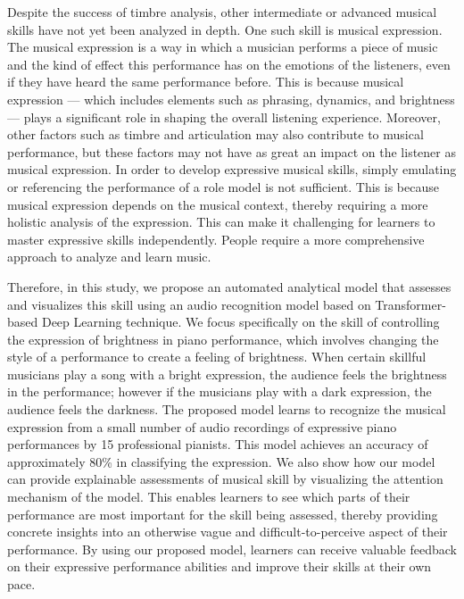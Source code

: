 \documentclass[manuscript,review,anonymous]{acmart}
\begin{document}
Despite the success of timbre analysis, other intermediate or advanced musical skills have not yet been analyzed in depth.
One such skill is musical expression.
The musical expression is a way in which a musician performs a piece of music and the kind of effect this performance has on the emotions of the listeners, even if they have heard the same performance before. 
This is because musical expression --- which includes elements such as phrasing, dynamics, and brightness --- plays a significant role in shaping the overall listening experience. 
Moreover, other factors such as timbre and articulation may also contribute to musical performance, but these factors may not have as great an impact on the listener as musical expression.
In order to develop expressive musical skills, simply emulating or referencing the performance of a role model is not sufficient.
This is because musical expression depends on the musical context, thereby requiring a more holistic analysis of the expression. 
This can make it challenging for learners to master expressive skills independently. 
People require a more comprehensive approach to analyze and learn music. 

Therefore, in this study, we propose an automated analytical model that assesses and visualizes this skill using an audio recognition model based on Transformer-based Deep Learning technique. 
We focus specifically on the skill of controlling the expression of brightness in piano performance, which involves changing the style of a performance to create a feeling of brightness. 
When certain skillful musicians play a song with a bright expression, the audience feels the brightness in the performance; however if the musicians play with a dark expression, the audience feels the darkness.
The proposed model learns to recognize the musical expression from a small number of audio recordings of expressive piano performances by 15 professional pianists.
This model achieves an accuracy of approximately 80\% in classifying the expression. 
We also show how our model can provide explainable assessments of musical skill by visualizing the attention mechanism of the model. 
This enables learners to see which parts of their performance are most important for the skill being assessed, thereby providing concrete insights into an otherwise vague and difficult-to-perceive aspect of their performance.
By using our proposed model, learners can receive valuable feedback on their expressive performance abilities and improve their skills at their own pace.
\end{document}
